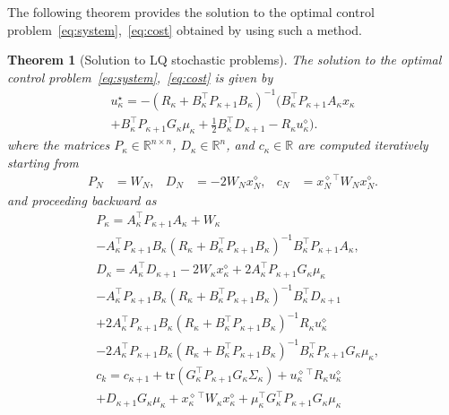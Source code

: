 \documentclass[10pt]{IEEEtran}      %
\newcommand{\R}{\mathbb{R}}
\newcommand{\tr}{\mathrm{tr}}
\theoremstyle{theorem}
\newtheorem{theo}{Theorem}
\theoremstyle{remark}
\begin{document}
The following theorem provides the solution to the optimal control problem~\eqref{eq:system},~\eqref{eq:cost}
obtained by using such a method.

\begin{theo}[Solution to LQ stochastic problems]\label{thm:opt}
The solution to the optimal control problem~\eqref{eq:system},~\eqref{eq:cost}
is given by
\begin{multline}\label{eq:optCont}
u_\kappa^\star =-(R_\kappa+B_\kappa^\top P_{\kappa+1}B_\kappa)^{-1} \biggr(B_\kappa^\top P_{\kappa+1}  A_\kappa x_\kappa\\
+B_\kappa^\top P_{\kappa+1} G_\kappa\mu_\kappa+\tfrac{1}{2}B_\kappa^\top D_{\kappa+1}-R_\kappa u_\kappa^\diamond\biggr).
\end{multline}
where the matrices $P_\kappa\in\R^{n\times n}$, $D_\kappa\in\R^n$, and $c_\kappa\in\R$ are computed iteratively starting from
\begin{align}\label{eq:finalMat}
P_N&=W_N, & D_N &= -2W_N x_N^\diamond,&c_N & = x_N^{\diamond\,\top}W_Nx_N^\diamond.
\end{align}
and proceeding backward as
\begin{subequations}
\begin{align}
&\nonumber P_\kappa  = A_\kappa^\top P_{\kappa+1}  A_\kappa +W_\kappa\\
& -A_\kappa^\top P_{\kappa+1}B_\kappa (R_\kappa+B_\kappa^\top P_{\kappa+1}B_\kappa)^{-1}B_\kappa^\top P_{\kappa+1}  A_\kappa,\label{eq:DRE}\\
&\nonumber D_\kappa  = A_\kappa^\top D_{\kappa+1}  - 2 W_\kappa x_\kappa^{\diamond} +2 A_\kappa^\top P_{\kappa+1}G_\kappa \mu_\kappa \\
&\nonumber-A_\kappa^\top P_{\kappa+1}  B_\kappa (R_\kappa+B_\kappa^\top P_{\kappa+1}B_\kappa)^{-1} B_\kappa^\top D_{\kappa+1}\\
&\nonumber +2 A_\kappa^\top P_{\kappa+1} B_\kappa (R_\kappa+B_\kappa^\top P_{\kappa+1}B_\kappa)^{-1}  R_\kappa u_\kappa^\diamond\\
& -2 A_\kappa^\top P_{\kappa+1} B_\kappa (R_\kappa+B_\kappa^\top P_{\kappa+1}B_\kappa)^{-1}   B_\kappa^\top P_{\kappa+1} 
G_\kappa \mu_\kappa,\\
&\nonumber c_k  = c_{\kappa+1}+\tr(G_\kappa^\top P_{\kappa+1}G_\kappa \Sigma_\kappa)+u_\kappa^{\diamond\,\top}R_\kappa u_\kappa^\diamond\\
&\nonumber +D_{\kappa+1}G_\kappa \mu_\kappa+ x_\kappa^{\diamond\,\top} W_\kappa x_\kappa^{\diamond}
+\mu_\kappa^\top G_\kappa^\top P_{\kappa+1}G_\kappa\mu_\kappa\\

\end{align}
\end{subequations}
\end{theo}
\end{document}
